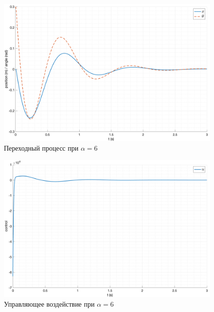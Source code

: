 \begin{figure}[ht!]
    \centering
    \includegraphics[width=\textwidth]{media/plots/nonmodal_controllers/out_3.png}
    \caption{Переходный процесс при $\alpha = 6$}
    \label{fig:nonmodal_control_alpha_3}
\end{figure}
\begin{figure}[ht!]
    \centering
    \includegraphics[width=\textwidth]{media/plots/nonmodal_controllers/u_3.png}
    \caption{Управляющее воздействие при $\alpha = 6$}
    \label{fig:nonmodal_control_alpha_3_u}
\end{figure}

